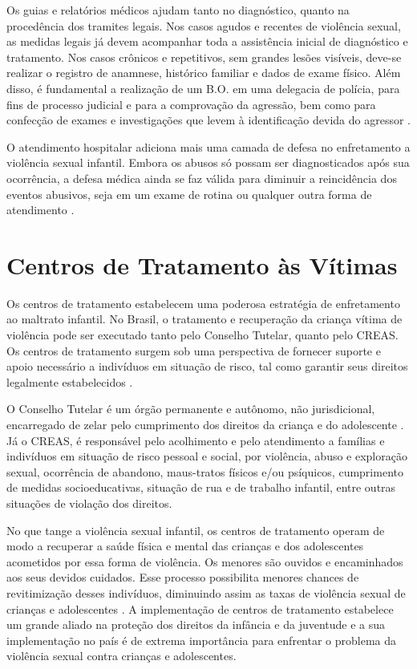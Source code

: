Os guias e relatórios médicos ajudam tanto no diagnóstico, quanto na procedência dos tramites legais. Nos casos agudos e recentes de violência sexual, as medidas legais já devem acompanhar toda a assistência inicial de diagnóstico e tratamento. Nos casos crônicos e repetitivos, sem grandes lesões visíveis, deve-se realizar o registro de anamnese, histórico familiar e dados de exame físico. Além disso, é fundamental a realização de um \ac{B.O.} em uma delegacia de polícia, para fins de processo judicial e para a comprovação da agressão, bem como para confecção de exames e investigações que levem à identificação devida do agressor \cite{paiva2012violencia}. 

O atendimento hospitalar adiciona mais uma camada de defesa no enfretamento a violência sexual infantil. Embora os abusos só possam ser diagnosticados após sua ocorrência, a defesa médica ainda se faz válida para diminuir a reincidência dos eventos abusivos, seja em um exame de rotina ou qualquer outra forma de atendimento \cite{costa2019maus}.


\section{Centros de Tratamento às Vítimas}\label{sec:centros}

Os centros de tratamento estabelecem uma poderosa estratégia de enfretamento ao maltrato infantil. No Brasil, o tratamento e recuperação da criança vítima de violência pode ser executado tanto pelo Conselho Tutelar, quanto pelo \ac{CREAS}. Os centros de tratamento surgem sob uma perspectiva de fornecer suporte e apoio necessário a indivíduos em situação de risco, tal como garantir seus direitos legalmente estabelecidos \cite{caccia2014conselheiros}.

O Conselho Tutelar é um órgão permanente e autônomo, não jurisdicional, encarregado de zelar pelo cumprimento dos direitos da criança e do adolescente \cite{brasil2002notificacao}. Já o \ac{CREAS}, é responsável pelo acolhimento e pelo atendimento a famílias e indivíduos em situação de risco pessoal e social, por violência, abuso e exploração sexual, ocorrência de abandono, maus-tratos físicos e/ou psíquicos, cumprimento de medidas socioeducativas, situação de rua e de trabalho infantil, entre outras situações de violação dos direitos.

No que tange a violência sexual infantil, os centros de tratamento operam de modo a recuperar a saúde física e mental das crianças e dos adolescentes acometidos por essa forma de violência. Os menores são ouvidos e encaminhados aos seus devidos cuidados. Esse processo possibilita menores chances de revitimização desses indivíduos, diminuindo assim as taxas de violência sexual de crianças e adolescentes \cite{faraj2016atendimento}. A implementação de centros de tratamento estabelece um grande aliado na proteção dos direitos da infância e da juventude e a sua implementação no país é de extrema importância para enfrentar o problema da violência sexual contra crianças e adolescentes. 

